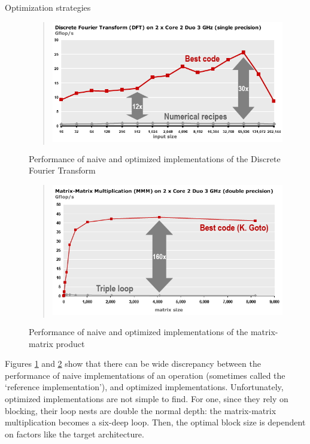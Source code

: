  {Optimization strategies}
\label{sec:scalar-opt}

\begin{figure}[ht]
  \begin{quote}
  \includegraphics[scale=.5]{graphics/dft}
  \end{quote}
  \caption{Performance of naive and optimized implementations of the Discrete Fourier Transform}
  \label{fig:dft-perf}
\end{figure}

\begin{figure}[ht]
  \begin{quote}
  \includegraphics[scale=.5]{graphics/gemm}
  \end{quote}
  \caption{Performance of naive and optimized implementations of the matrix-matrix product}
  \label{fig:gemm-perf}
\end{figure}

Figures \ref{fig:dft-perf} and \ref{fig:gemm-perf} show that there can
be wide discrepancy between the performance of naive implementations
of an operation (sometimes called the `reference implementation'), and
optimized implementations. Unfortunately, optimized implementations
are not simple to find. For one, since they rely on blocking, their
loop nests are double the normal depth: the matrix-matrix
multiplication becomes a six-deep loop. Then, the optimal block size
is dependent on factors like the target architecture.

